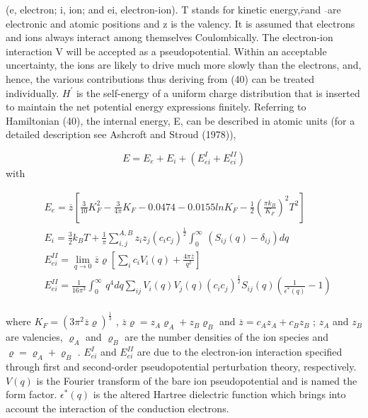 \documentclass[12pt]{article}
\newcommand*{\1}{\hspace{1pt}}
\begin{document}
    (e, electron; i, ion; and ei, electron-ion). T stands for kinetic energy,$\overline{r}$and $\overline{}$are 
    electronic and atomic positions and z is the valency. It is assumed that electrons and ions 
    always interact among themselves Coulombically. The electron-ion interaction V will be accepted 
    as a pseudopotential. Within an acceptable uncertainty, the ions are likely to drive much more 
    slowly than the electrons, and, hence, the various contributions thus deriving from (40) can 
    be treated individually. $H^{\prime}$  is the self-energy of a uniform charge distribution that is 
    inserted to maintain the net potential energy expressions finitely. Referring to Hamiltonian 
    (40), the internal energy, E, can be described in atomic units (for a detailed description
    see Ashcroft and Stroud (1978)),

        \begin{equation}
        E = E_e + E_i + (E^{I} _{ei} + E^{II} _{ei})
        \end{equation}
    with

    \begin{align}
        &  E_e =  \overline{z}\left[\frac{3}{10} K^{2} _F - \frac{3}{4\pi} K_F - 0.0474 - 0.0155 
            ln {K_F} - \frac{1}{2}\left(\frac{\pi k_B}{K_F} \right)^{2} T^2 \right] \\
        &  E_i =  \frac{3}{2}k_{B}T + \frac{1}{\pi}\sum_{i , j}^{A , B} z_{i}z_{j}\left(c_{i}c_{j}\right)^{\frac{1}{2}}
            \int_{0}^{\infty}  \,\left(S_{ij}(q) - \delta _{ij}\right) dq \\   
        & E^{II}_{ei} = \lim_{q \to 0} \overline{z}\varrho 
        \left[\sum_{i}^{} c_{i}V_{i}(q) + \frac{4\pi \overline{z}}{q^2} \right]  \\ 
        &  E^{II}_{ei} = \frac{1}{16{\pi}^3}\int_{0}^{\infty}  \,q^{4}dq \sum_{ij}^{} V_{i}(q)V_{j}(q) 
            \left(c_{i}c_{j}\right)^{\frac{1}{2}}S_{ij}(q)\left(\frac{1}{\epsilon^{ \ast}(q)} - 1 \right) 
        \end{align}\\

    where $K_F = \left( 3\pi ^{2}\overline{z}\varrho\right)^{\frac{1}{3}}$ , $\overline{z}\varrho = z_{A}\varrho_{A} + z_{B}\varrho_{B}$ and $\overline{z} = c_{A}z_{A} + c_{B}z_{B}$
    ; $z_A$ and $z_B$ are valencies, $\varrho _A$ and $\varrho _B$ are the number densities of the ion 
    species and $\varrho = \varrho _A + \varrho _B $ . $E^{I}_{ei}$ and $E^{II}_{ei}$ are due to
    the electron-ion interaction specified through first and second-order pseudopotential 
    perturbation
    theory, respectively. $V(q)$ is the Fourier transform of the bare ion pseudopotential and is
    named the form factor. $\epsilon ^{\ast}(q)$ is the altered Hartree dielectric function which brings into 
    account the interaction of the conduction electrons.\\
\end{document}
